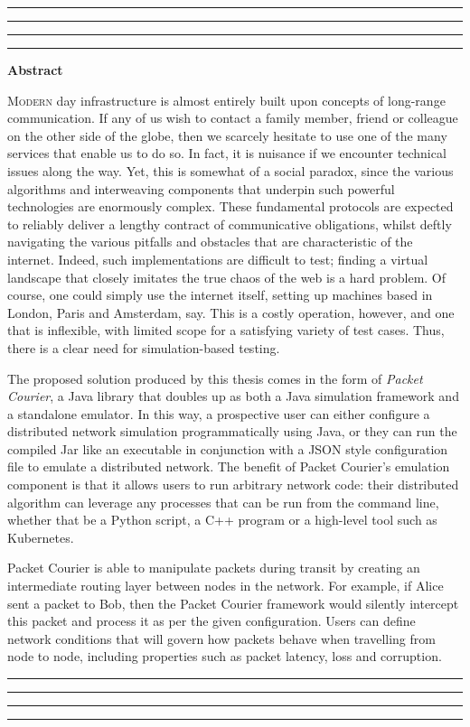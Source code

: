 \thispagestyle{empty}
\hrule\hrule\hrule\hrule %
\begin{center}
    \textbf{\large Abstract}
    \\
\end{center}

\noindent
\lettrine{M}{odern} day infrastructure is almost entirely built upon concepts of long-range communication. If any of
us wish to contact a family member, friend or colleague on the other side of the globe, then we scarcely hesitate to
use one of the many services that enable us to do so. In fact, it is nuisance if we encounter technical issues along
the way. Yet, this is somewhat of a social paradox, since the various algorithms and interweaving components
that underpin such powerful technologies are enormously complex. These fundamental protocols are expected to reliably
deliver a lengthy contract of communicative obligations, whilst deftly navigating the various pitfalls and obstacles
that are characteristic of the internet. Indeed, such implementations are difficult to test; finding a virtual
landscape that closely imitates the true chaos of the web is a hard problem. Of course, one could simply use the
internet itself, setting up machines based in London, Paris and Amsterdam, say. This is a costly operation, however,
and one that is inflexible, with limited scope for a satisfying variety of test cases. Thus, there is a clear need for
simulation-based testing.

The proposed solution produced by this thesis comes in the form of \emph{Packet Courier}, a Java library that doubles
up as both a Java simulation framework and a standalone emulator. In this way, a prospective user can either
configure a distributed network simulation programmatically using Java, or they can run the compiled Jar like an
executable in conjunction with a JSON style configuration file to emulate a distributed network. The benefit of
Packet Courier's emulation component is that it allows users to run arbitrary network code: their distributed
algorithm can leverage any processes that can be run from the command line, whether that be a Python script, a
C++ program or a high-level tool such as Kubernetes.

Packet Courier is able to manipulate packets during transit by creating an intermediate routing layer between nodes
in the network. For example, if Alice sent a packet to Bob, then the Packet Courier framework would silently
intercept this packet and process it as per the given configuration. Users can define network conditions that will
govern how packets behave when travelling from node to node, including properties such as packet latency, loss and
corruption.


\vfill
\hrule\hrule\hrule\hrule
\clearpage
